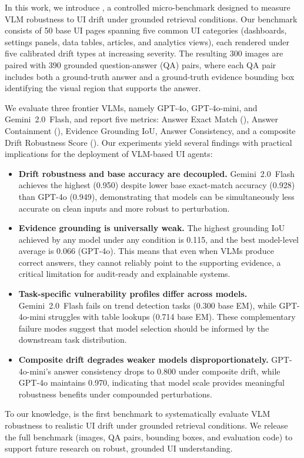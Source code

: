 In this work, we introduce \bench{}, a controlled micro-benchmark designed to measure VLM robustness to UI drift under grounded retrieval conditions. Our benchmark consists of 50 base UI pages spanning five common UI categories (dashboards, settings panels, data tables, articles, and analytics views), each rendered under five calibrated drift types at increasing severity. The resulting 300 images are paired with 390 grounded question-answer (QA) pairs, where each QA pair includes both a ground-truth answer and a ground-truth evidence bounding box identifying the visual region that supports the answer.

We evaluate three frontier VLMs, namely GPT-4o, GPT-4o-mini, and Gemini~2.0~Flash, and report five metrics: Answer Exact Match (\aem{}), Answer Containment (\ac{}), Evidence Grounding IoU, Answer Consistency, and a composite Drift Robustness Score (\drs{}). Our experiments yield several findings with practical implications for the deployment of VLM-based UI agents:

\begin{itemize}
    \item \textbf{Drift robustness and base accuracy are decoupled.} Gemini~2.0~Flash achieves the highest \drs{} (0.950) despite lower base exact-match accuracy (0.928) than GPT-4o (0.949), demonstrating that models can be simultaneously less accurate on clean inputs and more robust to perturbation.
    
    \item \textbf{Evidence grounding is universally weak.} The highest grounding IoU achieved by any model under any condition is 0.115, and the best model-level average is 0.066 (GPT-4o). This means that even when VLMs produce correct answers, they cannot reliably point to the supporting evidence, a critical limitation for audit-ready and explainable systems.
    
    \item \textbf{Task-specific vulnerability profiles differ across models.} Gemini~2.0~Flash fails on trend detection tasks (0.300 base EM), while GPT-4o-mini struggles with table lookups (0.714 base EM). These complementary failure modes suggest that model selection should be informed by the downstream task distribution.
    
    \item \textbf{Composite drift degrades weaker models disproportionately.} GPT-4o-mini's answer consistency drops to 0.800 under composite drift, while GPT-4o maintains 0.970, indicating that model scale provides meaningful robustness benefits under compounded perturbations.
\end{itemize}

To our knowledge, \bench{} is the first benchmark to systematically evaluate VLM robustness to realistic UI drift under grounded retrieval conditions. We release the full benchmark (images, QA pairs, bounding boxes, and evaluation code) to support future research on robust, grounded UI understanding.
